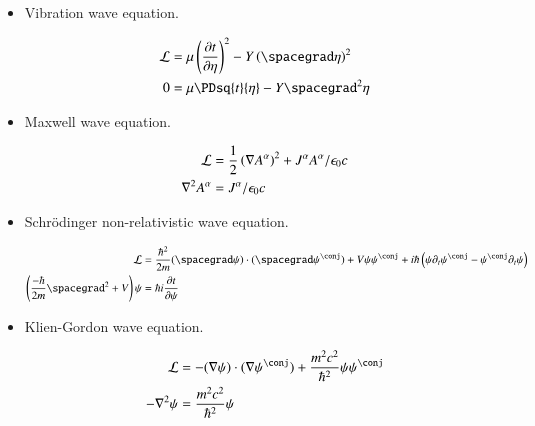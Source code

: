 \documentclass{article}
\begin{document}
\begin{itemize}

\item Vibration wave equation.

\begin{align*}
\LL &= \mu \left( \PD{t}{\eta} \right)^2 - Y \left( \spacegrad \eta \right)^2 \\
0 &= \mu \PDsq{t}{\eta} - Y \spacegrad^2 {\eta}
\end{align*}

\item Maxwell wave equation.

\begin{align*}
\mathcal{L} &= \frac{1}{2} \left( \nabla {A^\alpha} \right)^2 + J^\alpha A^\alpha / \epsilon_0 c \\
\nabla^2 A^\alpha &= J^\alpha/\epsilon_0 c 
\end{align*}

\item Schr\"{o}dinger non-relativistic wave equation.

\begin{align*}
\LL &= \frac{\hbar^2}{2m}
(\spacegrad \psi) \cdot (\spacegrad \psi^\conj) + V \psi \psi^\conj + {i \hbar} \left( \psi \partial_t \psi^\conj - \psi^\conj \partial_t \psi \right) \\
\left( \frac{-\hbar}{2m} \spacegrad^2 + V \right) \psi &= \hbar i \PD{t}{\psi}
\end{align*}

\item Klien-Gordon wave equation.

\begin{align*}
\LL &= -(\grad \psi) \cdot (\grad \psi^\conj) + \frac{m^2 c^2}{\hbar^2} \psi \psi^\conj \\
-\grad^2 \psi &= \frac{m^2 c^2}{\hbar^2} \psi
\end{align*}

\end{itemize}



\end{document}
